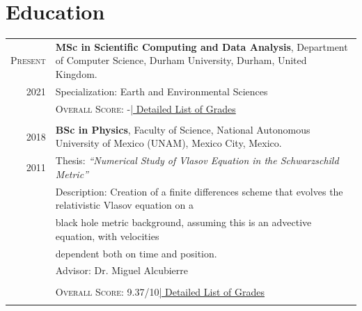 \documentclass[a4paper,10pt]{article} %
\begin{document}
\section{Education}
\bigskip
\begin{tabular}{r|p{14.5cm}}	
	
	\textsc{Present} & \textbf{MSc in Scientific Computing and Data Analysis}, Department of Computer Science, Durham University, \small Durham, United Kingdom.\\
	\textsc{2021} & Specialization: Earth and Environmental Sciences\\
	&\normalsize \textsc{Overall Score}: -\hyperlink{grdsmsc}{\hfill | \footnotesize Detailed List of Grades}\\
	\multicolumn{2}{c}{}\\

	
	\textsc{2018} & \textbf{BSc in Physics}, Faculty of Science, National Autonomous University of Mexico (UNAM), \small Mexico City, Mexico.\\
	\textsc{2011} & Thesis: \emph{``Numerical Study of Vlasov Equation in the Schwarzschild Metric''}\\
	&\small Description: Creation of a finite differences scheme that evolves the relativistic Vlasov equation on a\\
	&\hspace{1.7cm} \small black hole metric background, assuming this is an advective equation, with velocities \\
	&\hspace{1.7cm} \small dependent both on time and position.\\
	& \small Advisor: Dr. Miguel Alcubierre\\
	& \\
	&\normalsize \textsc{Overall Score}: 9.37/10\hyperlink{grdsbach}{\hfill | \footnotesize Detailed List of Grades}\\
	\multicolumn{2}{c}{}\\
	
	
\end{tabular}

\end{document}
